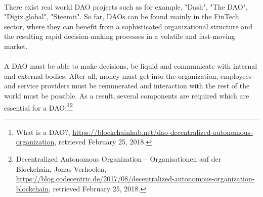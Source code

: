 \documentclass{scrartcl}
\begin{document}
     \paragraph{}
     There exist real world DAO projects such as for example, "Dash", "The DAO", "Digix.global", "Steemit". So far, DAOs can be found mainly in the FinTech sector, where they can benefit from a sophisticated organizational structure and the resulting rapid decision-making processes in a volatile and fast-moving market.
     
     \paragraph{}
     A DAO must be able to make decisions, be liquid and communicate with internal and external bodies. After all, money must get into the organization, employees and service providers must be remunerated and interaction with the rest of the world must be possible. As a result, several components are required which are essential for a DAO:\footnote{What is a DAO?, \url{https://blockchainhub.net/dao-decentralized-autonomous-organization}, retrieved February 25, 2018.}\footnote{Decentralized Autonomous Organization – Organisationen auf der Blockchain, Jonas Verhoelen, \url{https://blog.codecentric.de/2017/08/decentralized-autonomous-organization-blockchain}, retrieved February 25, 2018.}
    
\end{document}
